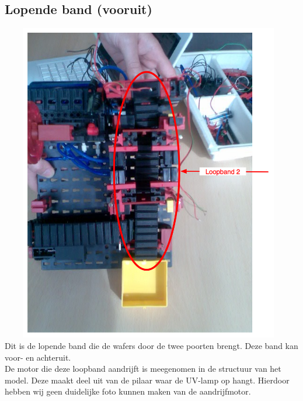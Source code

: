\subsection{Lopende band (vooruit)}\label{sub:lopende_band_vooruit_} %
  \includegraphics[width=13cm, height=14cm]{LB2} \\
  
  Dit is de lopende band die de wafers door de twee poorten brengt. Deze band kan voor- en achteruit. \\
   De motor die deze loopband aandrijft is meegenomen in de structuur van het model. Deze maakt deel uit van de pilaar waar de UV-lamp op hangt. Hierdoor hebben wij geen duidelijke foto kunnen maken van de aandrijfmotor.

